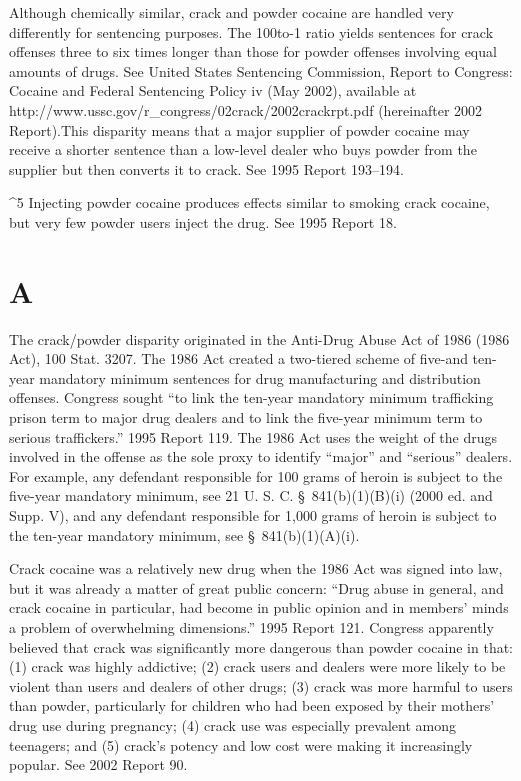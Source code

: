 {  Although chemically similar, crack and powder cocaine are handled
very differently for sentencing purposes. The 100to-1 ratio yields
sentences for crack offenses three to six times longer than those
for powder offenses involving equal amounts of drugs. See United
States Sentencing Commission, Report to Congress: Cocaine and
Federal Sentencing \newpage  Policy iv (May 2002), available at
http://www.ussc.gov/r_congress/02crack/2002crackrpt.pdf (hereinafter
2002 Report).\footnotemark[6] This disparity means that a major supplier of
powder cocaine may receive a shorter sentence than a low-level dealer
who buys powder from the supplier but then converts it to crack. See
1995 Report 193--194.

^5 Injecting powder cocaine produces effects similar to smoking crack
cocaine, but very few powder users inject the drug. See 1995 Report
18.

\section{A}

  The crack/powder disparity originated in the Anti-Drug Abuse Act of
1986 (1986 Act), 100 Stat. 3207. The 1986 Act created a two-tiered
scheme of five-and ten-year mandatory minimum sentences for drug
manufacturing and distribution offenses. Congress sought ``to link the
ten-year mandatory minimum trafficking prison term to major drug dealers
and to link the five-year minimum term to serious traffickers.'' 1995
Report 119. The 1986 Act uses the weight of the drugs involved in the
offense as the sole proxy to identify ``major'' and ``serious''
dealers. For example, any defendant responsible for 100 grams of
heroin is subject to the five-year mandatory minimum, see 21 U. S.
C. \S~841(b)(1)(B)(i) (2000 ed. and Supp. V), and any defendant
responsible for 1,000 grams of heroin is subject to the ten-year
mandatory minimum, see \S~841(b)(1)(A)(i).

  Crack cocaine was a relatively new drug when the 1986 Act was signed
into law, but it was already a matter of great public concern: ``Drug
abuse in general, and crack cocaine in particular, had become in public
opinion and in members' minds a problem of overwhelming dimensions.''
1995 Report 121. Congress apparently believed that crack was
significantly more dangerous than powder cocaine in that: (1) crack was
highly addictive; (2) crack users and dealers were more likely to be
violent than users and dealers of \newpage  other drugs; (3) crack was more
harmful to users than powder, particularly for children who had been
exposed by their mothers' drug use during pregnancy; (4) crack use was
especially prevalent among teenagers; and (5) crack's potency and low
cost were making it increasingly popular. See 2002 Report 90.

}
